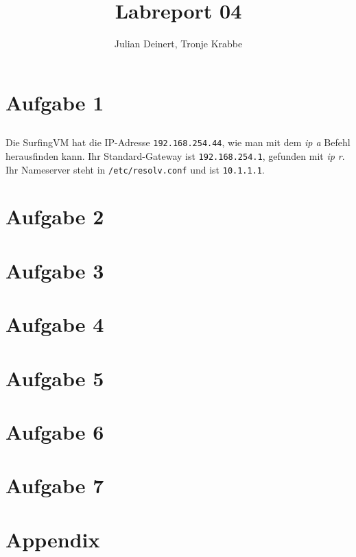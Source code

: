 \documentclass[10pt,a4paper]{article}
\author{Julian Deinert, Tronje Krabbe}
\title{Labreport 04}
\begin{document}
\maketitle
\tableofcontents
\newpage


\section*{Aufgabe 1}
\setcounter{subsection}{1}

\subsection{}
Die SurfingVM hat die IP-Adresse \texttt{192.168.254.44}, wie man mit dem \textit{ip a} Befehl herausfinden kann.
Ihr Standard-Gateway ist \texttt{192.168.254.1}, gefunden mit \textit{ip r}.
Ihr Nameserver steht in \texttt{/etc/resolv.conf} und ist \texttt{10.1.1.1}.

\setcounter{section}{2}
\setcounter{subsection}{0}
\section*{Aufgabe 2}

\setcounter{section}{3}
\setcounter{subsection}{0}
\section*{Aufgabe 3}

\section*{Aufgabe 4}
\setcounter{subsection}{0}

\section*{Aufgabe 5}
\setcounter{subsection}{0}

\section*{Aufgabe 6}

\section*{Aufgabe 7}

\newpage
\section*{Appendix}
\end{document}
